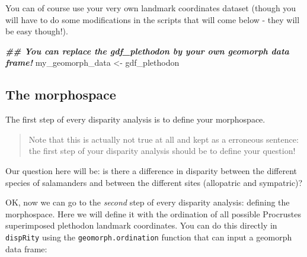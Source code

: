 \documentclass[
]{book}
\newenvironment{Shaded}{\begin{snugshade}}{\end{snugshade}}
\newcommand{\AttributeTok}[1]{\textcolor[rgb]{0.13,0.29,0.53}{#1}}
\newcommand{\DocumentationTok}[1]{\textcolor[rgb]{0.56,0.35,0.01}{\textbf{\textit{#1}}}}
\newcommand{\FunctionTok}[1]{\textcolor[rgb]{0.13,0.29,0.53}{\textbf{#1}}}
\newcommand{\NormalTok}[1]{#1}
\newcommand{\OtherTok}[1]{\textcolor[rgb]{0.56,0.35,0.01}{#1}}
\newcommand{\SpecialCharTok}[1]{\textcolor[rgb]{0.81,0.36,0.00}{\textbf{#1}}}
\begin{document}
\begin{Shaded}
\end{Shaded}

You can of course use your very own landmark coordinates dataset (though you will have to do some modifications in the scripts that will come below - they will be easy though!).

\begin{Shaded}
\begin{Highlighting}[]
\DocumentationTok{\#\# You can replace the gdf\_plethodon by your own geomorph data frame!}
\NormalTok{my\_geomorph\_data }\OtherTok{\textless{}{-}}\NormalTok{ gdf\_plethodon}
\end{Highlighting}
\end{Shaded}

\hypertarget{the-morphospace-1}{%
\subsection{The morphospace}\label{the-morphospace-1}}

The first step of every disparity analysis is to define your morphospace.

\begin{quote}
Note that this is actually not true at all and kept as a erroneous sentence: the first step of your disparity analysis should be to define your question!
\end{quote}

Our question here will be: is there a difference in disparity between the different species of salamanders and between the different sites (allopatric and sympatric)?

OK, now we can go to the \emph{second} step of every disparity analysis: defining the morphospace.
Here we will define it with the ordination of all possible Procrustes superimposed plethodon landmark coordinates.
You can do this directly in \texttt{dispRity} using the \texttt{geomorph.ordination} function that can input a geomorph data frame:
\end{document}
